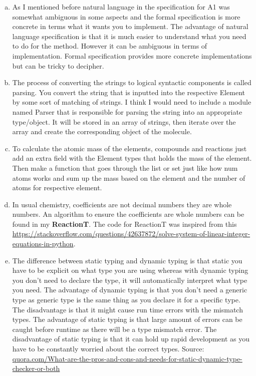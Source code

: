 \documentclass[12pt]{article}
\begin{document}
\begin{enumerate}[a)]

\item As I mentioned before natural language in the specification for A1 was somewhat ambiguous in some aspects and the formal specification is more concrete in terms what it wants you to implement. The advantage of natural language specification is that it is much easier to understand what you need to do for the method. However it can be ambiguous in terms of implementation. Formal specification provides more concrete implementations but can be tricky to decipher.

\item The process of converting the strings to logical syntactic components is called parsing. You convert the string that is inputted into the respective Element by some sort of matching of strings. I think I would need to include a module named Parser that is responsible for parsing the string into an appropriate type/object. It will be stored in an array of strings, then iterate over the array and create the corresponding object of the molecule.

\item To calculate the atomic mass of the elements, compounds and reactions just add an extra field with the Element types that holds the mass of the element. Then make a function that goes through the list or set just like how num atoms works and sum up the mass based on the element and the number of atoms for respective element.

\item In usual chemistry, coefficients are not decimal numbers they are whole numbers. An algorithm to ensure the coefficients are whole numbers can be found in my \textbf{ReactionT}. The code for ReactionT was inspired from this \url{https://stackoverflow.com/questions/42637872/solve-system-of-linear-integer-equations-in-python}.

\item The difference between static typing and dynamic typing is that static you have to be explicit on what type you are using whereas with dynamic typing you don't need to declare the type, it will automatically interpret what type you need. The advantage of dynamic typing is that you don't need a generic type as generic type is the same thing as you declare it for a specific type. The disadvantage is that it might cause run time errors with the mismatch types. The advantage of static typing is that large amount of errors can be caught before runtime as there will be a type mismatch error. The disadvantage of static typing is that it can hold up rapid development as you have to be constantly worried about the correct types. Source: \url{quora.com/What-are-the-pros-and-cons-and-needs-for-static-dynamic-type-checker-or-both}


\end{enumerate}
\end{document}
